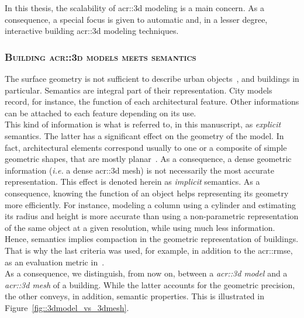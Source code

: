             In this thesis, the scalability of \gls{acr::3d} modeling is a main concern.
            As a consequence, a special focus is given to automatic and, in a lesser degree, interactive building \gls{acr::3d} modeling techniques.

        \subsubsection{\textsc{Building \texorpdfstring{\gls*{acr::3d}}{3D} models meets semantics}}
            \label{subsubsec::introduction::urban_3d_reconstruction::building_3d_modeling::semantics}
            The surface geometry is not sufficient to describe urban objects~\parencite{biljecki2016improved}, and buildings in particular.
            Semantics are integral part of their representation.
            City models record, for instance, the function of each architectural feature.
            Other informations can be attached to each feature depending on its use.\\
            This kind of information is what is referred to, in this manuscript, as \textit{explicit} semantics.
            The latter has a significant effect on the geometry of the model.
            In fact, architectural elements correspond usually to one or a composite of simple geometric shapes, that are mostly planar~\parencite{kolbe2005citygml}.
            As a consequence, a dense geometric information (\textit{i.e.} a dense \gls{acr::3d} mesh) is not necessarily the most accurate representation.
            This effect is denoted herein as \textit{implicit} semantics.
            As a consequence, knowing the function of an object helps representing its geometry more efficiently.
            For instance, modeling a column using a cylinder and estimating its radius and height is more accurate than using a non-parametric representation of the same object at a given resolution, while using much less information.
            Hence, semantics implies compaction in the geometric representation of buildings.
            That is why the last criteria was used, for example, in addition to the \gls{acr::rmse}, as an evaluation metric in~\textcite{lafarge2012creating}.\\
            As a consequence, we distinguish, from now on, between a \textit{\gls{acr::3d} model} and a \textit{\gls{acr::3d} mesh} of a building.
            While the latter accounts for the geometric precision, the other conveys, in addition, semantic properties.
            This is illustrated in Figure~\ref{fig::3dmodel_vs_3dmesh}.\\

